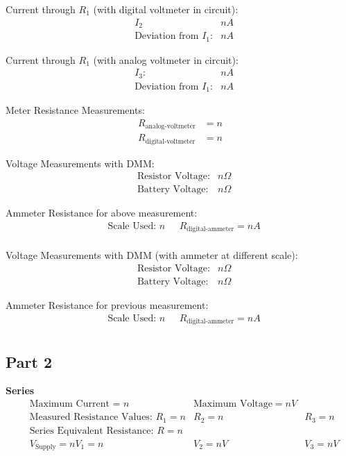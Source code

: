 \documentclass[twocolumn,english]{IEEEtran}
\theoremstyle{plain}
\theoremstyle{plain}
\begin{document}
  Current through $R_1$ (with digital voltmeter in circuit):
  \begin{align*}
   &I_2  &n A \\
   &\text{Deviation from $I_1$:} &n A
  \end{align*}

  Current through $R_1$ (with analog voltmeter in circuit):
  \begin{align*}
   &I_3: & n A \\
   &\text{Deviation from $I_1$:} &n A
  \end{align*}

  Meter Resistance Measurements:
  \begin{align*}
   R_{\text{analog-voltmeter}} 	&= n \\
   R_{\text{digital-voltmeter}}	&= n
  \end{align*}

  Voltage Measurements with DMM:
  \begin{align*}
   &\text{Resistor Voltage:} & n \Omega \\
   &\text{Battery Voltage:}  & n \Omega
  \end{align*}

  Ammeter Resistance for above measurement:
  \begin{align*}
   &\text{Scale Used: $n$ } &R_\text{digital-ammeter} = n A \\
  \end{align*}

  Voltage Measurements with DMM (with ammeter at different scale):
  \begin{align*}
   &\text{Resistor Voltage:} & n \Omega \\
   &\text{Battery Voltage:}  & n \Omega
  \end{align*}

  Ammeter Resistance for previous measurement:
  \begin{align*}
   &\text{Scale Used: $n$ } &R_\text{digital-ammeter} = n A \\
  \end{align*}

  \subsection*{\textbf{Part 2}}
  \textbf{Series}
  \begin{align*}
   &\text{Maximum Current = $n$}	&\text{Maximum Voltage}=n V 	\\
   &\text{Measured Resistance Values: }	R_1=n 	&R_2=n 	&R_3=n 		\\
   &\text{Series Equivalent Resistance: } R = n 			\\
   &V_{\text{Supply}}=n		 V_1=n		&V_2 = nV	&V_3=nV	\\
  \end{align*}
\end{document}
